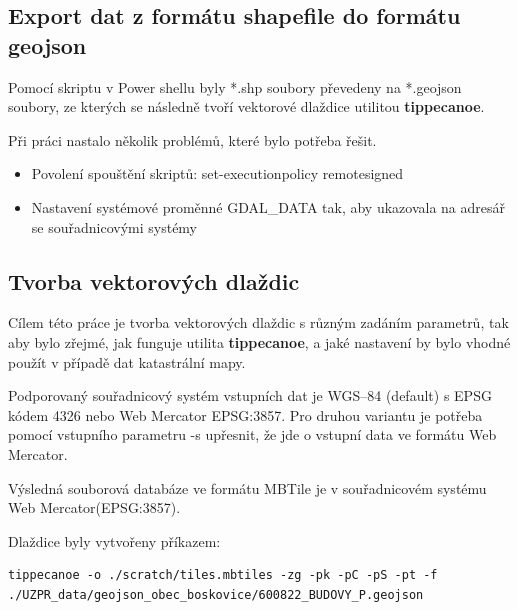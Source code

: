 \documentclass[12pt]{article}
\begin{document}
\subsection{Export dat z formátu shapefile do formátu geojson}

Pomocí skriptu v Power shellu byly *.shp soubory převedeny na *.geojson soubory, ze kterých se následně tvoří vektorové dlaždice utilitou \textbf{tippecanoe}.

\vspace{0.5cm}
Při práci nastalo několik problémů, které bylo potřeba řešit.
\begin{itemize}
	
	\item Povolení spouštění skriptů: set-executionpolicy remotesigned
	
	\item Nastavení systémové proměnné GDAL\_DATA tak, aby ukazovala na adresář se souřadnicovými systémy
	
\end{itemize}



\subsection{Tvorba vektorových dlaždic}
Cílem této práce je tvorba vektorových dlaždic s různým zadáním parametrů, tak aby bylo zřejmé, jak funguje utilita \textbf{tippecanoe}, a jaké nastavení by bylo vhodné použít v případě dat katastrální mapy.

Podporovaný souřadnicový systém vstupních dat je WGS--84 (default) s EPSG kódem 4326 nebo Web Mercator EPSG:3857. Pro druhou variantu je potřeba pomocí vstupního parametru -s upřesnit, že jde o vstupní data ve formátu Web Mercator.

Výsledná souborová databáze ve formátu MBTile je v souřadnicovém systému Web Mercator(EPSG:3857).

\vspace{0.5cm}
Dlaždice byly vytvořeny příkazem:

\begin{lstlisting}
tippecanoe -o ./scratch/tiles.mbtiles -zg -pk -pC -pS -pt -f
./UZPR_data/geojson_obec_boskovice/600822_BUDOVY_P.geojson
\end{lstlisting}
\end{document}
